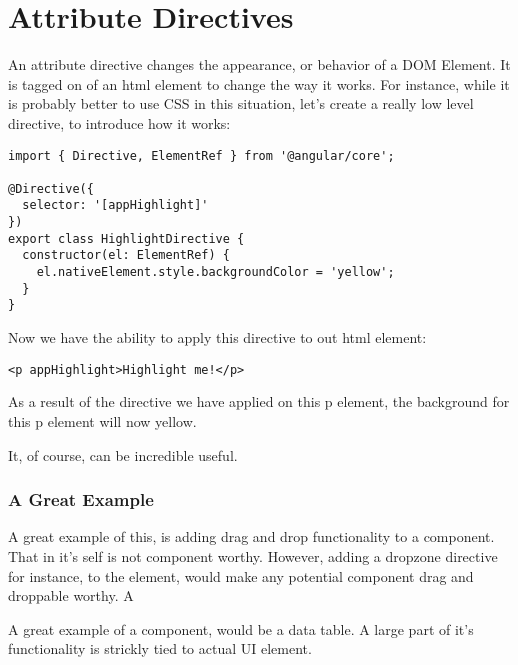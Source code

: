 \section{ Attribute Directives }
\maketitle{}

An attribute directive changes the appearance, or behavior of a DOM Element.
It is tagged on of an html element to change the way it works. For instance,
while it is probably better to use CSS in this situation, let's create a
really low level directive, to introduce how it works:
\begin{lstlisting}
import { Directive, ElementRef } from '@angular/core';

@Directive({
  selector: '[appHighlight]'
})
export class HighlightDirective {
  constructor(el: ElementRef) {
    el.nativeElement.style.backgroundColor = 'yellow';
  }
}
\end{lstlisting}

Now we have the ability to apply this directive to out html element:
\begin{lstlisting}
<p appHighlight>Highlight me!</p>
\end{lstlisting}

As a result of the directive we have applied on this p element, the background
for this p element will now yellow.

It, of course, can be incredible useful.


\subsubsection{A Great Example}
A great example of this, is adding drag and drop functionality to a component.
That in it's self is not component worthy. However, adding a dropzone directive
for instance, to the element, would make any potential component drag and
droppable worthy. A

A great example of a component, would be a data table. A large part of it's
functionality is strickly tied to actual UI element.

